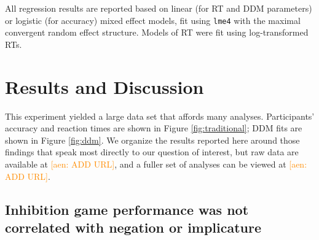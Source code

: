 \documentclass[10pt,letterpaper]{article}
\newcommand{\aen}[1]{\textcolor{DarkOrange}{[aen: #1]}}
\begin{document}
All regression results are reported based on linear (for RT and DDM parameters) or logistic (for accuracy) mixed effect models, fit using \texttt{lme4} with the maximal convergent random effect structure. Models of RT were fit using log-transformed RTs.


\section{Results and Discussion}

This experiment yielded a large data set that affords many analyses.  Participants' accuracy and reaction times are shown in Figure \ref{fig:traditional}; DDM fits are shown in Figure \ref{fig:ddm}. We organize the results reported here around those findings that speak most directly to our question of interest, but raw data are available at \aen{ADD URL}, and a fuller set of analyses can be viewed at \aen{ADD URL}.


\subsection{Inhibition game performance was not correlated with negation or implicature}

\end{document}
